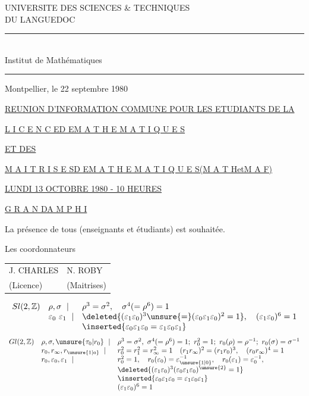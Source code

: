 

UNIVERSITE DES SCIENCES \& TECHNIQUES\\
DU LANGUEDOC

\rule{3cm}{.4pt}\\
Institut de Mathématiques\\
\rule{3cm}{.4pt}

Montpellier, le 22 septembre 1980

\uline{REUNION D'INFORMATION COMMUNE POUR LES ETUDIANTS DE LA}

\uline{L I C E N C E\quad D E\quad M A T H E M A T I Q U E S}

\uline{ET DES}

\uline{M A I T R I S E S\quad D E\quad M A T H E M A T I Q U E S\quad (M A T H\quad et\quad M A F)}

\uline{LUNDI 13 OCTOBRE 1980 - 10 HEURES}

\uline{G R A N D\quad A M P H I}

La présence de tous (enseignants et étudiants) est souhaitée.

Les coordonnateurs

\begin{tabular}{ll}
J. CHARLES & N. ROBY\\
(Licence) & (Maitrises)
\end{tabular}



\[
\begin{array}{lll}
Sl(2,\mathbb Z)&\rho,\sigma\ \mid&\rho^3=\sigma^2,\quad\sigma^4(=\rho^6)=1\\
&\varepsilon_0\ \varepsilon_1\ \mid&\deleted{(\varepsilon_1\varepsilon_0)^3\unsure{=}(\varepsilon_0\varepsilon_1\varepsilon_0)^2=1},\quad(\varepsilon_1\varepsilon_0)^6=1\\
&&\inserted{\varepsilon_0\varepsilon_1\varepsilon_0=\varepsilon_1\varepsilon_0\varepsilon_1}
\end{array}
\]
\[
\begin{array}{lll}
Gl(2,\mathbb Z)&\rho,\sigma,\unsure{\tau_0|r_0}\ \mid&\rho^3=\sigma^2,\ \sigma^4(=\rho^6)=1;\ r_0^2=1;\ r_0(\rho)=\rho^{-1};\ r_0(\sigma)=\sigma^{-1}\\
&r_0,r_\infty,r_{\unsure{1|a}}\ \mid&r_0^2=r_1^2=r_\infty^2=1\quad(r_1r_\infty)^2=(r_1r_0)^3,\quad(r_0r_\infty)^4=1\\
&r_0,\varepsilon_0,\varepsilon_1\ \mid&r_0^2=1,\quad r_0(\varepsilon_0)=\varepsilon_{\unsure{1|0}}^{-1},\quad r_0(\varepsilon_1)=\varepsilon_0^{-1},\\
&&\deleted{(\varepsilon_1\varepsilon_0)^3(\varepsilon_0\varepsilon_1\varepsilon_0)^{\unsure{2}}=1}\\
&&\inserted{\varepsilon_0\varepsilon_1\varepsilon_0=\varepsilon_1\varepsilon_0\varepsilon_1}\\
&&(\varepsilon_1\varepsilon_0)^6=1
\end{array}
\]

